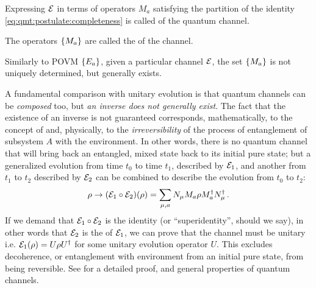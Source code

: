 Expressing $\mathcal{E}$ in terms of operators $M_a$
satisfying the partition of the identity \eqref{eq:qmt:postulate:completeness}
is called
 of the quantum channel.

The operators $\left\{M_a\right\}$ are called the 
of the channel.

Similarly to POVM $\left\{E_a\right\}$, given a particular channel $\mathcal{E}$,
the set $\left\{M_a\right\}$ is not uniquely determined, but
generally exists.

A fundamental comparison with unitary evolution is that
quantum channels can be \emph{composed} too, but \emph{an inverse
does not generally exist}.
The fact that the existence of an inverse is not guaranteed corresponds,
mathematically, to the concept of 
and, physically, to the \emph{irreversibility} of the process
of entanglement of subsystem $A$ with the environment. In other words,
there is no quantum channel that will bring back an entangled,
mixed state back to its initial pure state;
but a generalized evolution from time $t_0$ to time $t_1$,
described by $\mathcal{E}_1$,
and another from $t_1$ to $t_2$ described by $\mathcal{E}_2$
can be combined to describe the evolution from $t_0$ to $t_2$:
\[
  \rho \rightarrow \qty(\mathcal{E}_1 \circ \mathcal{E}_2) (\rho) =
  \sum_{\mu,a} N_{\mu} M_a \rho M_a^{\dagger} N_{\mu}^{\dagger}
  \,\text{.}
\]
If we demand that $\mathcal{E}_1 \circ \mathcal{E}_2$
is the identity (or ``superidentity'', should we say),
in other words that $\mathcal{E}_2$
is the  of $\mathcal{E}_1$,
we can prove that the channel must be unitary i.e.
$\mathcal{E}_1(\rho) = U \rho U^{\dagger}$
for some unitary evolution operator $U$.
This excludes decoherence,
or entanglement with environment from an initial pure state,
from being reversible.
See \cite[sec.3.2]{PreskillNotes} for a detailed proof,
and general properties of quantum channels.
